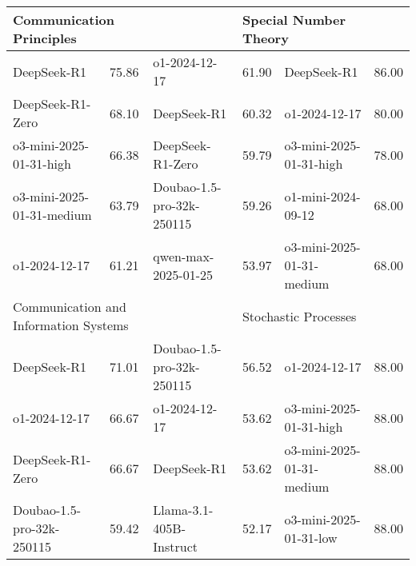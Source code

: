 {\begin{longtable}{p{4.2cm}>{\centering\arraybackslash} p{0.8cm}|p{4.2cm} >{\centering\arraybackslash} p{0.8cm}|p{4.2cm} >{\centering\arraybackslash} p{0.8cm}}
\hline
\multicolumn{2}{p{5.15cm}|}{\cellcolor{blue!10} \centering Communication Principles} & \multicolumn{2}{p{5.15cm}|}{\cellcolor{yellow!10} \centering Human Anatomy and Histology-Embryology} & \multicolumn{2}{p{5.15cm}}{\cellcolor{green!10} \centering Special Number Theory}\\
\hline
\cellcolor{blue!5} DeepSeek-R1 & \cellcolor{blue!2}75.86 & \cellcolor{yellow!5} o1-2024-12-17 & \cellcolor{yellow!2} 61.90 & \cellcolor{green!5} DeepSeek-R1 & \cellcolor{green!2} 86.00\\
\cellcolor{blue!5} DeepSeek-R1-Zero & \cellcolor{blue!2}68.10 & \cellcolor{yellow!5} DeepSeek-R1 & \cellcolor{yellow!2} 60.32 & \cellcolor{green!5} o1-2024-12-17 & \cellcolor{green!2} 80.00\\
\cellcolor{blue!5} o3-mini-2025-01-31-high & \cellcolor{blue!2}66.38 & \cellcolor{yellow!5} DeepSeek-R1-Zero & \cellcolor{yellow!2} 59.79 & \cellcolor{green!5} o3-mini-2025-01-31-high & \cellcolor{green!2} 78.00\\
\cellcolor{blue!5} o3-mini-2025-01-31-medium & \cellcolor{blue!2}63.79 & \cellcolor{yellow!5} Doubao-1.5-pro-32k-250115 & \cellcolor{yellow!2} 59.26 & \cellcolor{green!5} o1-mini-2024-09-12 & \cellcolor{green!2} 68.00\\
\cellcolor{blue!5} o1-2024-12-17 & \cellcolor{blue!2}61.21 & \cellcolor{yellow!5} qwen-max-2025-01-25 & \cellcolor{yellow!2} 53.97 & \cellcolor{green!5} o3-mini-2025-01-31-medium & \cellcolor{green!2} 68.00\\
\hline
\multicolumn{2}{p{5.15cm}|}{\cellcolor{blue!10} \centering Communication and Information Systems} & \multicolumn{2}{p{5.15cm}|}{\cellcolor{yellow!10} \centering Immunology} & \multicolumn{2}{p{5.15cm}}{\cellcolor{green!10} \centering Stochastic Processes}\\
\hline
\cellcolor{blue!5} DeepSeek-R1 & \cellcolor{blue!2}71.01 & \cellcolor{yellow!5} Doubao-1.5-pro-32k-250115 & \cellcolor{yellow!2} 56.52 & \cellcolor{green!5} o1-2024-12-17 & \cellcolor{green!2} 88.00\\
\cellcolor{blue!5} o1-2024-12-17 & \cellcolor{blue!2}66.67 & \cellcolor{yellow!5} o1-2024-12-17 & \cellcolor{yellow!2} 53.62 & \cellcolor{green!5} o3-mini-2025-01-31-high & \cellcolor{green!2} 88.00\\
\cellcolor{blue!5} DeepSeek-R1-Zero & \cellcolor{blue!2}66.67 & \cellcolor{yellow!5} DeepSeek-R1 & \cellcolor{yellow!2} 53.62 & \cellcolor{green!5} o3-mini-2025-01-31-medium & \cellcolor{green!2} 88.00\\
\cellcolor{blue!5} Doubao-1.5-pro-32k-250115 & \cellcolor{blue!2}59.42 & \cellcolor{yellow!5} Llama-3.1-405B-Instruct & \cellcolor{yellow!2} 52.17 & \cellcolor{green!5} o3-mini-2025-01-31-low & \cellcolor{green!2} 88.00\\

\end{longtable}}
